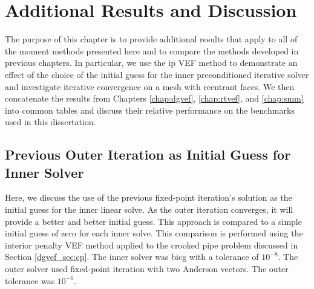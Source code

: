\documentclass[../doc.tex]{subfiles}
\begin{document}
\chapter{Additional Results and Discussion} \label{chap:disc}
The purpose of this chapter is to provide additional results that apply to all of the moment methods presented here and to compare the methods developed in previous chapters. In particular, we use the \gls{ip} VEF method to demonstrate an effect of the choice of the initial guess for the inner preconditioned iterative solver and investigate iterative convergence on a mesh with reentrant faces. We then concatenate the results from Chapters \ref{chap:dgvef}, \ref{chap:rtvef}, and \ref{chap:smm} into common tables and discuss their relative performance on the benchmarks used in this dissertation. 

\section{Previous Outer Iteration as Initial Guess for Inner Solver}
Here, we discuss the use of the previous fixed-point iteration's solution as the initial guess for the inner linear solve. As the outer iteration converges, it will provide a better and better initial guess. This approach is compared to a simple initial guess of zero for each inner solve. This comparison is performed using the interior penalty VEF method applied to the crooked pipe problem discussed in Section \ref{dgvef_sec:cp}. The inner solver was \gls{bicg} with a tolerance of $10^{-8}$. The outer solver used fixed-point iteration with two Anderson vectors. The outer tolerance was $10^{-6}$. 
\end{document}
